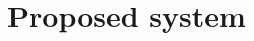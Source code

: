 \documentclass[12pt,a4paper]{article}
\begin{document}

 
 





\section{Proposed system}
\end{document}
